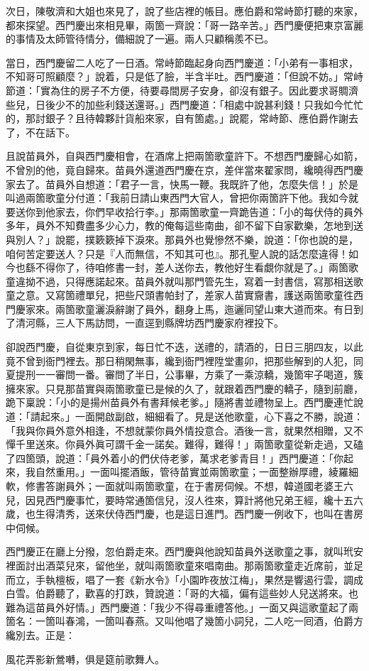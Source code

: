 次日，陳敬濟和大姐也來見了，說了些店裡的帳目。應伯爵和常峙節打聽的來家，都來探望。西門慶出來相見畢，兩箇一齊說：「哥一路辛苦。」西門慶便把東京富麗的事情及太師管待情分，備細說了一遍。兩人只顧稱羨不已。

當日，西門慶留二人吃了一日酒。常峙節臨起身向西門慶道：「小弟有一事相求，不知哥可照顧麼？」說着，只是低了臉，半含半吐。{}西門慶道：「但說不妨。」常峙節道：「實為住的房子不方便，待要尋間房子安身，卻沒有銀子。因此要求哥賙濟些兒，日後少不的加些利錢送還哥。」西門慶道：「相處中說甚利錢！只我如今忙忙的，那討銀子？且待韓夥計貨船來家，自有箇處。」說罷，常峙節、應伯爵作謝去了，不在話下。

且說苗員外，自與西門慶相會，在酒席上把兩箇歌童許下。不想西門慶歸心如箭，不曾別的他，竟自歸來。苗員外還道西門慶在京，差伴當來翟家問，纔曉得西門慶家去了。苗員外自想道：「君子一言，快馬一鞭。我既許了他，怎麼失信！」於是叫過兩箇歌童分付道：「我前日請山東西門大官人，曾把你兩箇許下他。我如今就要送你到他家去，你們早收拾行李。」那兩箇歌童一齊跪告道：「小的每伏侍的員外多年，員外不知費盡多少心力，教的俺每這些南曲，卻不留下自家歡樂，怎地到送與別人？」說罷，撲簌簌掉下淚來。那員外也覺慘然不樂，說道：「你也說的是，咱何苦定要送人？只是『人而無信，不知其可也』。那孔聖人說的話怎麼違得！如今也繇不得你了，待咱修書一封，差人送你去，{}教他好生看覷你就是了。」兩箇歌童違拗不過，只得應諾起來。苗員外就叫那門管先生，寫着一封書信，寫那相送歌童之意。又寫箇禮單兒，把些尺頭書帕封了，差家人苗實齎書，護送兩箇歌童徃西門慶家來。兩箇歌童灑淚辭謝了員外，翻身上馬，迤邐同望山東大道而來。有日到了清河縣，三人下馬訪問，一直逕到縣牌坊西門慶家府裡投下。

卻說西門慶，自從東京到家，每日忙不迭，送禮的，請酒的，日日三朋四友，以此竟不曾到衙門裡去。那日稍閑無事，纔到衙門裡陞堂畫卯，把那些解到的人犯，同夏提刑一一審問一番。審問了半日，公事畢，方乘了一乘涼轎，幾箇牢子喝道，簇擁來家。只見那苗實與兩箇歌童已是候的久了，就跟着西門慶的轎子，隨到前廳，跪下稟說：「小的是揚州苗員外有書拜候老爹。」隨將書並禮物呈上。西門慶連忙說道：「請起來。」一面開啟副啟，細細看了。見是送他歌童，心下喜之不勝，說道：「我與你員外意外相逢，不想就蒙你員外情投意合。酒後一言，就果然相贈，又不憚千里送來。你員外眞可謂千金一諾矣。難得，難得！」兩箇歌童從新走過，又磕了四箇頭，說道：「員外着小的們伏侍老爹，萬求老爹青目！」西門慶道：「你起來，我自然重用。」一面叫擺酒飯，管待苗實並兩箇歌童；一面整辦厚禮，綾羅細軟，修書答謝員外；一面就叫兩箇歌童，在于書房伺候。不想，韓道國老婆王六兒，因見西門慶事忙，要時常通箇信兒，沒人徃來，算計將他兄弟王經，纔十五六歲，也生得清秀，送來伏侍西門慶，也是這日進門。西門慶一例收下，也叫在書房中伺候。

西門慶正在廳上分撥，忽伯爵走來。西門慶與他說知苗員外送歌童之事，就叫玳安裡面討出酒菜兒來，留他坐，就叫兩箇歌童來唱南曲。那兩箇歌童走近席前，並足而立，手執檀板，唱了一套《新水令》「小園昨夜放江梅」，果然是響遏行雲，調成白雪。伯爵聽了，歡喜的打跌，贊說道：「哥的大福，偏有這些妙人兒送將來。也難為這苗員外好情。」西門慶道：「我少不得尋重禮答他。」一面又與這歌童起了兩箇名：一箇叫春鴻，一箇叫春燕。又叫他唱了幾箇小詞兒，二人吃一囘酒，伯爵方纔別去。正是：

\begin{myquote}
風花弄影新鶯囀，俱是筵前歌舞人。
\end{myquote}

